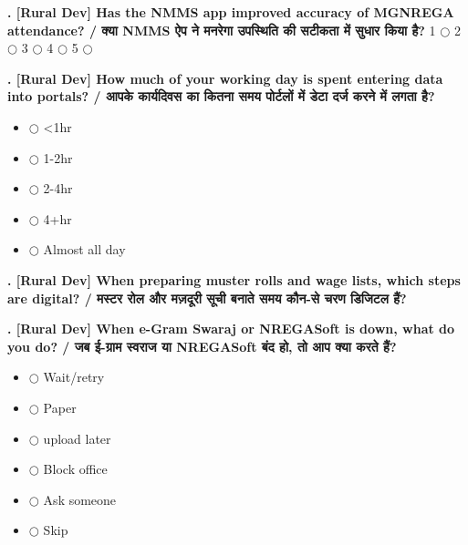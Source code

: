 \documentclass[11pt,a4paper]{article}
\newcounter{qcounter}
\begin{document}
\textbf{. [Rural Dev] Has the NMMS app improved accuracy of MGNREGA attendance? / क्या NMMS ऐप ने मनरेगा उपस्थिति की सटीकता में सुधार किया है?}
\vspace{0.1cm}
\vspace{0.1cm}
1 $\bigcirc$ \hspace{1cm} 2 $\bigcirc$ \hspace{1cm} 3 $\bigcirc$ \hspace{1cm} 4 $\bigcirc$ \hspace{1cm} 5 $\bigcirc$
\vspace{0.4cm}

\textbf{. [Rural Dev] How much of your working day is spent entering data into portals? / आपके कार्यदिवस का कितना समय पोर्टलों में डेटा दर्ज करने में लगता है?}
\vspace{0.1cm}
\begin{itemize}[label=, itemsep=0.1cm, leftmargin=0.5cm]
    \item $\bigcirc$ <1hr
    \item $\bigcirc$ 1-2hr
    \item $\bigcirc$ 2-4hr
    \item $\bigcirc$ 4+hr
    \item $\bigcirc$ Almost all day
\end{itemize}
\vspace{0.2cm}

\textbf{. [Rural Dev] When preparing muster rolls and wage lists, which steps are digital? / मस्टर रोल और मज़दूरी सूची बनाते समय कौन-से चरण डिजिटल हैं?}
\vspace{0.1cm}
\vspace{0.2cm}
\hrulefill\par\vspace{0.6cm}\hrulefill\par\vspace{0.6cm}\hrulefill
\vspace{0.4cm}

\textbf{. [Rural Dev] When e-Gram Swaraj or NREGASoft is down, what do you do? / जब ई-ग्राम स्वराज या NREGASoft बंद हो, तो आप क्या करते हैं?}
\vspace{0.1cm}
\begin{itemize}[label=, itemsep=0.1cm, leftmargin=0.5cm]
    \item $\bigcirc$ Wait/retry
    \item $\bigcirc$ Paper
    \item $\bigcirc$ upload later
    \item $\bigcirc$ Block office
    \item $\bigcirc$ Ask someone
    \item $\bigcirc$ Skip
\end{itemize}
\vspace{0.2cm}
\end{document}
